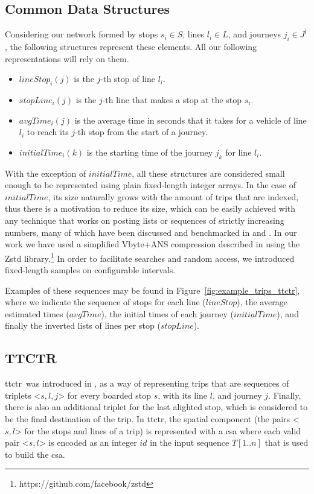     \subsection{Common Data Structures}
    \label{sec:cs}
    Considering our network formed by stops $s_i \in S$, lines $l_i \in L$, and journeys $j_i \in J^l$, the following structures represent these elements. All our following representations will rely on them.
    
    \begin{itemize}
        \item $lineStop_i(j)$ is the $j$-th stop of line $l_i$.
        \item $stopLine_i(j)$ is the $j$-th line that makes a stop at the stop $s_i$.
        \item $avgTime_i(j)$ is the average time in seconds that it takes for a vehicle of line $l_i$ to reach its $j$-th stop from the start of a journey.
        \item $initialTime_i(k)$ is the starting time of the journey $j_k$ for line $l_i$.
    \end{itemize}
    
    With the exception of $initialTime$, all these structures are considered small enough to be represented using plain fixed-length integer arrays. In the case of $initialTime$, its size naturally grows with the amount of trips that are indexed, thus there is a motivation to reduce its size, which can be easily achieved with any technique that works on posting lists or sequences of strictly increasing numbers, many of which have been discussed and benchmarked in \cite{claude2016universal} and \cite{farina2019reproducibility}. In our work we have used a simplified Vbyte+ANS compression described in \cite{moffat2017ans} using the Zstd library.\footnote{https://github.com/facebook/zstd} In order to facilitate searches and random access, we introduced fixed-length samples on configurable intervals.
    
    Examples of these sequences may be found in Figure~\ref{fig:example_trips_ttctr}, where we indicate the sequence of stops for each line ($lineStop$), the average estimated times ($avgTime$), the initial times of each journey ($initialTime$), and finally the inverted lists of lines per stop ($stopLine$).
    
    \subsection{TTCTR}
    \label{sec:newctr:str:ttctr}
    \acrfull{ttctr}~was introduced in \cite{brisaboa2018new}, as a way of representing trips that are sequences of triplets <$s,l,j$> for every boarded stop $s$, with its line $l$, and journey $j$. Finally, there is also an additional triplet for the last alighted stop, which is considered to be the final destination of the trip. In \gls{ttctr}, the spatial component (the pairs <$s,l$> for the stops and lines of a trip) is represented with a \gls{csa} where each valid pair <$s,l$> is encoded as an integer $id$ in the input sequence $T[1..n]$ that is used to build the \gls{csa}.

